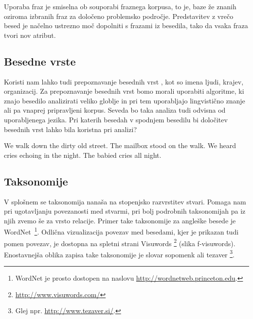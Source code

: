 Uporaba fraz je smiselna ob souporabi fraznega korpusa, to je, baze že
znanih oziroma izbranih fraz za določeno problemsko
področje. Predstavitev z vrečo besed je načelno ustrezno moč dopolniti
s frazami iz besedila, tako da vsaka fraza tvori nov atribut.

\subsection{Besedne vrste}

Koristi nam lahko tudi prepoznavanje besednih vrst
, kot so imena ljudi, krajev, organizacij. Za
prepoznavanje besednih vrst bomo morali uporabiti algoritme, ki znajo
besedilo analizirati veliko globlje in pri tem uporabljajo lingvistično
znanje ali pa vnaprej pripravljeni korpus. Seveda bo taka analiza tudi
odvisna od uporabljenega jezika. Pri katerih besedah v spodnjem
besedilu bi določitev besednih vrst lahko bila koristna pri analizi?

\begin{python}
We walk down the dirty old street.
The mailbox stood on the walk.
We heard cries echoing in the night.
The babied cries all night.
\end{python}

\subsection{Taksonomije}

V splošnem se taksonomija nanaša na stopenjsko razvrstitev
stvari. Pomaga nam pri ugotavljanju povezanosti med stvarmi, pri bolj
podrobnih taksonomijah pa iz njih zvemo še za
vrsto relacije. Primer take taksonomije za angleške besede je
WordNet~\footnote{WordNet je prosto dostopen na naslovu
  \url{http://wordnetweb.princeton.edu}.}. Odlična vizualizacija
povezav med besedami, kjer je prikazan tudi pomen povezav, je dostopna
na spletni strani Visuwords \footnote{\url{http://www.visuwords.com/}}
(slika f-visuwords). Enostavnejša oblika zapisa take taksonomije je
slovar sopomenk ali tezaver \footnote{Glej
  npr. \url{http://www.tezaver.si/}.}.

